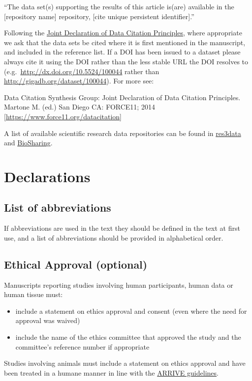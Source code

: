 \documentclass[a4paper,num-refs]{oup-contemporary}
\begin{document}
``The data set(s) supporting the results of this article is(are) available in the [repository name] repository, [cite unique persistent identifier].''

Following the \href{https://www.force11.org/group/joint-declaration-data-citation-principles-final}{Joint Declaration of Data Citation Principles}, where appropriate we ask that the data sets be cited where it is first mentioned in the manuscript, and included in the reference list. If a DOI has been issued to a dataset please always cite it using the DOI rather than the less stable URL the DOI resolves to (e.g.~\url{http://dx.doi.org/10.5524/100044} rather than \url{http://gigadb.org/dataset/100044}). For more see:

Data Citation Synthesis Group: Joint Declaration of Data Citation Principles. Martone M. (ed.) San Diego CA: FORCE11; 2014 [\url{https://www.force11.org/datacitation}]

A list of available scientific research data repositories can be found in \href{http://www.re3data.org/}{res3data} and \href{https://biosharing.org/}{BioSharing}.

\section{Declarations}

\subsection{List of abbreviations}
If abbreviations are used in the text they should be defined in the text at first use, and a list of abbreviations should be provided in alphabetical order.

\subsection{Ethical Approval (optional)}
Manuscripts reporting studies involving human participants, human data or human tissue must:

\begin{itemize}
\item include a statement on ethics approval and consent (even where the need for approval was waived)
\item include the name of the ethics committee that approved the study and the committee's reference number if appropriate
\end{itemize}

Studies involving animals must include a statement on ethics approval and have been treated in a humane manner in line with the \href{http://www.nc3rs.org.uk/arrive-guidelines}{ARRIVE guidelines}.
\end{document}
